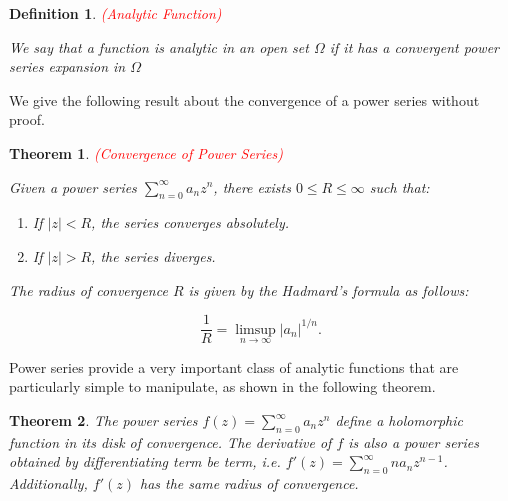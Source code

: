 \documentclass{article}
\newtheorem{definition}{Definition}
\newtheorem{theorem}{Theorem}
\begin{document}
\begin{definition} \textcolor{red}{(Analytic Function)}

We say that a function is analytic in an open set $\Omega$ if it has a convergent power series expansion in $\Omega$
\end{definition}

We give the following result about the convergence of a power series without proof. 

\begin{theorem} \textcolor{red}{(Convergence of Power Series)}

Given a power series $\sum^\infty_{n=0}a_nz^n$, there exists $0\leq R\leq\infty$ such that:

\begin{enumerate}
\item
If $|z|<R$, the series converges absolutely.

\item
If $|z|>R$, the series diverges.
\end{enumerate}

The radius of convergence $R$ is given by the Hadmard's formula as follows:

\begin{equation}
\frac{1}{R}=\limsup_{n\rightarrow\infty}|a_n|^{1/n}.
\end{equation}
\end{theorem}

Power series provide a very important class of analytic functions that are particularly simple to manipulate, as shown in the following theorem. 

\begin{theorem} \label{thm:power_series_conv} 
The power series $f(z)=\sum^\infty_{n=0}a_nz^n$ define a holomorphic function in its disk of convergence. The derivative of $f$ is also a power series obtained by differentiating term be term, i.e. $f'(z)=\sum^\infty_{n=0}na_nz^{n-1}$. Additionally, $f'(z)$ has the same radius of convergence. 
\end{theorem}
\end{document}
